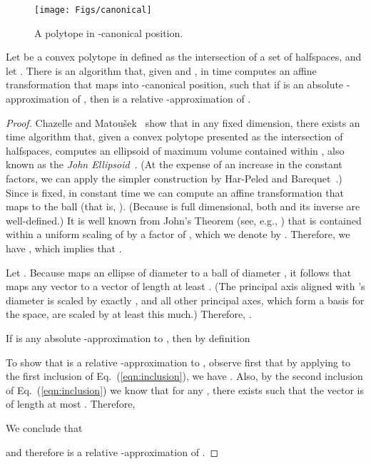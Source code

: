 \documentclass[11pt]{article}   \usepackage[letterpaper,hmargin=2.1cm,vmargin=3cm]{geometry}
\begin{document}
\begin{figure}[htbp]
  \centerline{\texttt{[image: Figs/canonical]}}
  \caption{A polytope in -canonical position.}
  \label{fig:canonical}
\end{figure}


\begin{lemma} \label{lem:precondition-1}
Let  be a convex polytope in  defined as the intersection of a set  of  halfspaces, and let . There is an algorithm that, given  and , in  time computes an affine transformation  that maps  into -canonical position, such that if  is an absolute -approximation of , then  is a relative -approximation of .
\end{lemma}


\begin{proof}
Chazelle and Matou\v{s}ek~\cite{ChM96} show that in any fixed dimension, there exists an  time algorithm that, given a convex polytope  presented as the intersection of  halfspaces, computes an ellipsoid  of maximum volume contained within , also known as the \emph{John Ellipsoid}~\cite{Bal97}. (At the expense of an increase in the constant factors, we can apply the simpler construction by Har-Peled and Barequet~\cite{BHP-bbox}.) Since  is fixed, in constant time we can compute an affine transformation  that maps  to the ball  (that is, ). (Because  is full dimensional, both  and its inverse  are well-defined.) It is well known from John's Theorem (see, e.g., \cite{Bal97}) that  is contained within a uniform scaling of  by a factor of , which we denote by . Therefore, we have , which implies that .

Let . Because  maps an ellipse of diameter  to a ball of diameter , it follows that  maps any vector  to a vector of length at least . (The principal axis aligned with 's diameter is scaled by exactly , and all other principal axes, which form a basis for the space, are scaled by at least this much.) Therefore, . 

If  is any absolute -approximation to , then by definition 

To show that  is a relative -approximation to , observe first that by applying  to the first inclusion of Eq.~(\ref{eqn:inclusion}), we have . Also, by the second inclusion of Eq.~(\ref{eqn:inclusion}) we know that for any , there exists  such that the vector  is of length at most . Therefore, 

We conclude that

and therefore  is a relative -approximation of .
\end{proof}
\end{document}
